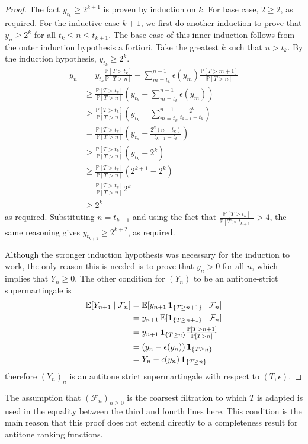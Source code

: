 \begin{proof}
The fact $y_{t_k} \geq 2^{k+1}$ is proven by induction on $k$. For base case, $2 \geq 2$, as required. For the inductive case $k+1$, we first do another induction to prove that $y_n \geq 2^k$ for all $t_k \leq n \leq t_{k+1}$. The base case of this inner induction follows from the outer induction hypothesis a fortiori. Take the greatest $k$ such that $n > t_k$. By the induction hypothesis, $y_{t_k} \geq 2^k$.
\begin{align*}
    y_n & = y_{t_k} \frac{\mathbb P[T > t_k]}{\mathbb P[T > n]} - \sum_{m=t_k}^{n-1} \epsilon(y_m) \frac{\mathbb P[T > m+1]}{\mathbb P[T > n]} \\
    & \geq \frac{\mathbb P[T > t_k]}{\mathbb P[T > n]} (y_{t_k} - \sum_{m=t_k}^{n-1} \epsilon(y_m)) \\
    & \geq \frac{\mathbb P[T > t_k]}{\mathbb P[T > n]} (y_{t_k} - \sum_{m=t_k}^{n-1} \frac{2^k}{t_{k+1}-t_k}) \\
    & = \frac{\mathbb P[T > t_k]}{\mathbb P[T > n]} (y_{t_k} - \frac{2^k (n - t_k)}{t_{k+1}-t_k}) \\
    & \geq \frac{\mathbb P[T > t_k]}{\mathbb P[T > n]} (y_{t_k} - 2^k) \\
    & \geq \frac{\mathbb P[T > t_k]}{\mathbb P[T > n]} (2^{k+1} - 2^k) \\
    & = \frac{\mathbb P[T > t_k]}{\mathbb P[T > n]} 2^k \\
    & \geq 2^k
\end{align*}
as required. Substituting $n = t_{k+1}$ and using the fact that $\frac{\mathbb P[T > t_k]}{\mathbb P[T > t_{k+1}]} > 4$, the same reasoning gives $y_{t_{k+1}} \geq 2^{k+2}$, as required.

Although the stronger induction hypothesis was necessary for the induction to work, the only reason this is needed is to prove that $y_n > 0$ for all $n$, which implies that $Y_n \geq 0$. 
The other condition for $(Y_n)$ to be an antitone-strict supermartingale is
\begin{align*}
    \mathbb{E}[Y_{n+1} \mid \mathcal F_n] 
    &=  \mathbb{E}[y_{n+1} \, {\bf 1}_{\{{T \geq n+1}\}} \mid \mathcal F_n] \\
    &=  y_{n+1} \, \mathbb{E}[{\bf 1}_{\{{T \geq n+1}\}} \mid \mathcal F_n] \\ 
    &=  y_{n+1} \, {\bf 1}_{\{{T \geq n}\}} \textstyle \frac{\mathbb P[T > n+1]}{\mathbb P[T > n]} \\
    &=  (y_n - \epsilon(y_n)) \, {\bf 1}_{\{{T \geq n}\}} \\
    &= Y_n - \epsilon(y_n) \, {\bf 1}_{\{{T \geq n}\}}
\end{align*}
therefore $(Y_n)_n$ is an antitone strict supermartingale with respect to $(T,\epsilon)$.
\end{proof}

The assumption that $(\mathcal F_n)_{n \geq 0}$ is the coarsest filtration to which $T$ is adapted is used in the equality between the third and fourth lines here. This condition is the main reason that this proof does not extend directly to a completeness result for antitone ranking functions.

